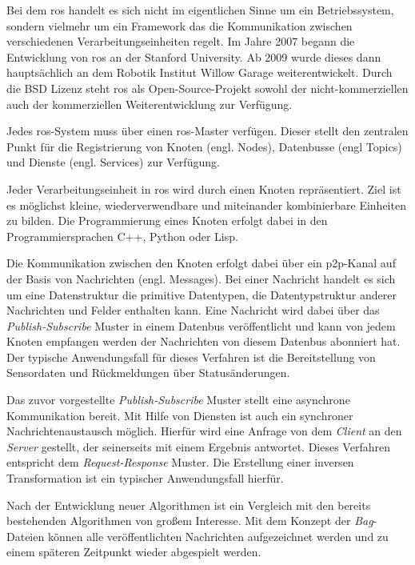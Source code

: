 Bei dem \Gls{ros} handelt es sich nicht im eigentlichen Sinne um ein Betriebssystem, sondern vielmehr um ein Framework das die Kommunikation zwischen verschiedenen Verarbeitungseinheiten regelt. Im Jahre 2007 begann die Entwicklung von \Gls{ros} an der Stanford University. Ab 2009 wurde dieses dann hauptsächlich an dem Robotik Institut Willow Garage weiterentwickelt. Durch die BSD Lizenz steht \Gls{ros} als Open-Source-Projekt sowohl der nicht-kommerziellen auch der kommerziellen Weiterentwicklung zur Verfügung. \cite{quigley2009ros}

Jedes \Gls{ros}-System muss über einen \Gls{ros}-Master verfügen. Dieser stellt den zentralen Punkt für die Registrierung von Knoten (engl. Nodes), Datenbusse (engl Topics) und Dienste (engl. Services) zur Verfügung.

Jeder Verarbeitungseinheit in \Gls{ros} wird durch einen Knoten repräsentiert. Ziel ist es möglichst kleine, wiederverwendbare und miteinander kombinierbare Einheiten zu bilden. Die Programmierung eines Knoten erfolgt dabei in den Programmiersprachen C++, Python oder Lisp.

Die Kommunikation zwischen den Knoten erfolgt dabei über ein \Gls{p2p}-Kanal auf der Basis von Nachrichten (engl. Messages). Bei einer Nachricht handelt es sich um eine Datenstruktur die primitive Datentypen, die Datentypstruktur anderer Nachrichten und Felder enthalten kann. Eine Nachricht wird dabei über das \textit{Publish-Subscribe} Muster in einem Datenbus veröffentlicht und kann von jedem Knoten empfangen werden der Nachrichten von diesem Datenbus abonniert hat. Der typische Anwendungsfall für dieses Verfahren ist die Bereitstellung von Sensordaten und Rückmeldungen über Statusänderungen.

Das zuvor vorgestellte \textit{Publish-Subscribe} Muster stellt eine asynchrone Kommunikation bereit. Mit Hilfe von Diensten ist auch ein synchroner Nachrichtenaustausch möglich. Hierfür wird eine Anfrage von dem \textit{Client} an den \textit{Server} gestellt, der seinerseits mit einem Ergebnis antwortet. Dieses Verfahren entspricht dem \textit{Request-Response} Muster. Die Erstellung einer inversen Transformation ist ein typischer Anwendungsfall hierfür.

Nach der Entwicklung neuer Algorithmen ist ein Vergleich mit den bereits bestehenden Algorithmen von großem Interesse. Mit dem Konzept der \textit{Bag}-Dateien können alle veröffentlichten Nachrichten aufgezeichnet werden und zu einem späteren Zeitpunkt wieder abgespielt werden.

